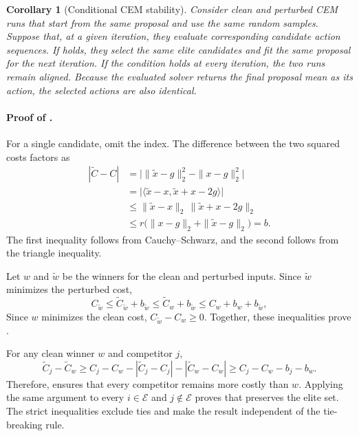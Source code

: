 \documentclass[10pt]{article}
\newtheorem{corollary}{Corollary}
\begin{document}
\begin{corollary}[Conditional CEM stability]\label{cor:adaptive-cem-alignment}
Consider clean and perturbed CEM runs that start from the same proposal and use
the same random samples. Suppose that, at a given iteration, they evaluate
corresponding candidate action sequences. If
 holds, they select the same elite candidates
and fit the same proposal for the next iteration. If the condition holds at
every iteration, the two runs remain aligned. Because the evaluated solver
returns the final proposal mean as its action, the selected actions are also
identical.
\end{corollary}

\paragraph{Proof of .}
For a single candidate, omit the index. The difference between the two squared
costs factors as
\begin{align}
|\tilde C-C|
&=\bigl|\|\tilde x-g\|_2^2-\|x-g\|_2^2\bigr| \\
&=\bigl|\langle \tilde x-x,\tilde x+x-2g\rangle\bigr| \\
&\le \|\tilde x-x\|_2\,\|\tilde x+x-2g\|_2 \\
&\le r\bigl(\|x-g\|_2+\|\tilde x-g\|_2\bigr)=b .
\end{align}
The first inequality follows from Cauchy--Schwarz, and the second follows from
the triangle inequality.

Let $w$ and $\tilde w$ be the winners for the clean and perturbed inputs. Since
$\tilde w$ minimizes the perturbed cost,
\[
C_{\tilde w}
\leq \tilde C_{\tilde w}+b_{\tilde w}
\leq \tilde C_w+b_{\tilde w}
\leq C_w+b_w+b_{\tilde w},
\]
Since $w$ minimizes the clean cost, $C_{\tilde w}-C_w\geq0$. Together, these
inequalities prove .

For any clean winner $w$ and competitor $j$,
\[
\tilde C_j-\tilde C_w
\ge C_j-C_w-|\tilde C_j-C_j|-|\tilde C_w-C_w|
\ge C_j-C_w-b_j-b_w.
\]
Therefore,  ensures that every competitor
remains more costly than $w$. Applying the same argument to every
$i\in\mathcal E$ and $j\notin\mathcal E$ proves that
 preserves the elite set. The strict
inequalities exclude ties and make the result independent of the tie-breaking
rule.
\end{document}

